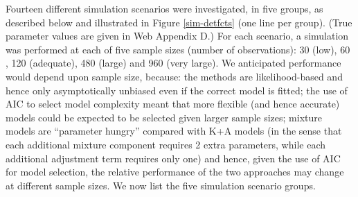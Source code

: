 \documentclass[useAMS,referee,usenatbib]{biom}
\begin{document}
Fourteen different simulation scenarios were investigated, in five groups, as described below and illustrated in Figure \ref{sim-detfcts} (one line per group). (True parameter values are given in Web Appendix D.)  For each scenario, a simulation was performed at each of five sample sizes (number of observations): 30 (low), 60 \citep[recommended minimum for line transects;][]{Buckland:2001vm}, 120 (adequate), 480 (large) and 960 (very large).  We anticipated performance would depend upon sample size, because: the methods are likelihood-based and hence only asymptotically unbiased even if the correct model is fitted; the use of AIC to select model complexity meant that more flexible (and hence accurate) models could be expected to be selected given larger sample sizes; mixture models are ``parameter hungry'' compared with K+A models (in the sense that each additional mixture component requires 2 extra parameters, while each additional adjustment term requires only one) and hence, given the use of AIC for model selection, the relative performance of the two approaches may change at different sample sizes. We now list the five simulation scenario groups.
\end{document}
